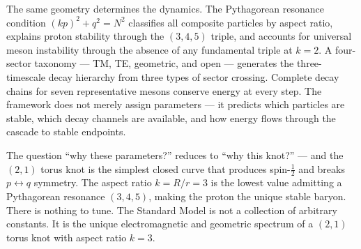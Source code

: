 \documentclass[11pt,a4paper]{article}
\begin{document}
The same geometry determines the dynamics. The Pythagorean resonance condition $(kp)^2 + q^2 = N^2$ classifies all composite particles by aspect ratio, explains proton stability through the $(3,4,5)$ triple, and accounts for universal meson instability through the absence of any fundamental triple at $k=2$. A four-sector taxonomy --- TM, TE, geometric, and open --- generates the three-timescale decay hierarchy from three types of sector crossing. Complete decay chains for seven representative mesons conserve energy at every step. The framework does not merely assign parameters --- it predicts which particles are stable, which decay channels are available, and how energy flows through the cascade to stable endpoints.

The question ``why these parameters?'' reduces to ``why this knot?'' --- and the $(2,1)$ torus knot is the simplest closed curve that produces spin-$\tfrac{1}{2}$ and breaks $p\leftrightarrow q$ symmetry. The aspect ratio $k=R/r=3$ is the lowest value admitting a Pythagorean resonance $(3,4,5)$, making the proton the unique stable baryon. There is nothing to tune. The Standard Model is not a collection of arbitrary constants. It is the unique electromagnetic and geometric spectrum of a $(2,1)$ torus knot with aspect ratio $k=3$.
\end{document}
